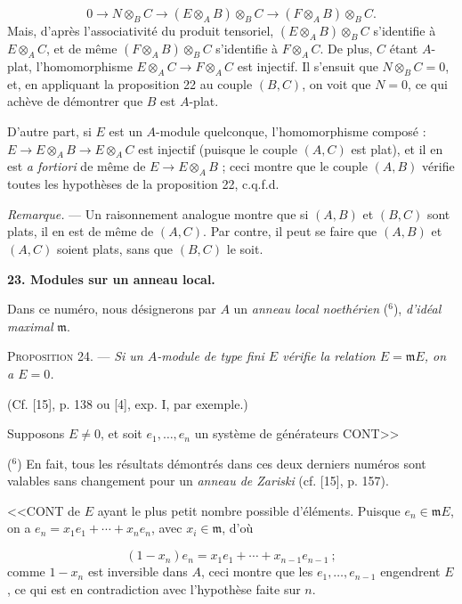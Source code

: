 \begin{equation*}
0 \to N \otimes_B C \to (E \otimes_A B) \otimes_B C \to (F \otimes_A B) \otimes_B C.
\end{equation*}
Mais, d'après l'associativité du produit tensoriel, $(E \otimes_A B) \otimes_B C$ s'identifie à $E \otimes_A C$, et de même $(F \otimes_A B) \otimes_B C$ s'identifie à $F \otimes_A C$. De plus, $C$ étant $A$-plat, l'homomorphisme $E \otimes_A C \to F \otimes_A C$ est injectif. Il s'ensuit que $N \otimes_B C = 0$, et, en appliquant la proposition 22 au couple $(B, C)$, on voit que $N = 0$, ce qui achève de démontrer que $B$ est $A$-plat.

D'autre part, si $E$ est un $A$-module quelconque, l'homomorphisme composé : $E \to E \otimes_A B \to E \otimes_A C$ est injectif (puisque le couple $(A, C)$ est plat), et il en est \emph{a fortiori} de même de $E \to E \otimes_A B$ ; ceci montre que le couple $(A, B)$ vérifie toutes les hypothèses de la proposition 22, c.q.f.d.

\emph{Remarque.} --- Un raisonnement analogue montre que si $(A, B)$ et $(B, C)$ sont plats, il en est de même de $(A, C)$. Par contre, il peut se faire que $(A, B)$ et $(A, C)$ soient plats, sans que $(B, C)$ le soit.


\textbf{23. Modules sur un anneau local.}

Dans ce numéro, nous désignerons par $A$ un \emph{anneau local noethérien} ($^{6}$), \emph{d'idéal maximal} $\mathfrak{m}$.

\textsc{Proposition 24}. --- \emph{Si un $A$-module de type fini $E$ vérifie la relation $E = \mathfrak{m}E$, on a $E = 0$.}

(Cf. [15], p. 138 ou [4], exp. I, par exemple.)

Supposons $E \neq 0$, et soit $e_1, \ldots, e_n$ un système de générateurs CONT>>

($^{6}$) En fait, tous les résultats démontrés dans ces deux derniers numéros sont valables sans changement pour un \emph{anneau de Zariski} (cf. [15], p. 157).



<<CONT de $E$ ayant le plus petit nombre possible d'éléments. Puisque $e_n \in \mathfrak{m}E$, on a $e_n = x_1 e_1 + \cdots + x_n e_n$, avec $x_i \in \mathfrak{m}$, d'où

\begin{equation*}
(1 - x_n) e_n = x_1 e_1 + \cdots + x_{n-1} e_{n-1} \ ;
\end{equation*}
comme $1 - x_n$ est inversible dans $A$, ceci montre que les $e_1, \ldots, e_{n-1}$ engendrent $E$, ce qui est en contradiction avec l'hypothèse faite sur $n$.

